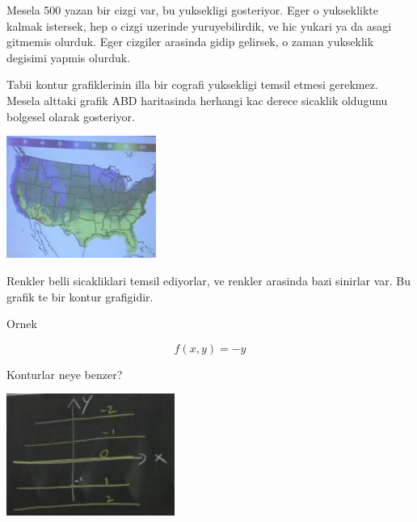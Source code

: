 \documentclass[12pt,fleqn]{article}
\begin{document}
Mesela 500 yazan bir cizgi var, bu yuksekligi gosteriyor. Eger o
yukseklikte kalmak istersek, hep o cizgi uzerinde yuruyebilirdik, ve hic
yukari ya da asagi gitmemis olurduk. Eger cizgiler arasinda gidip gelirsek,
o zaman yukseklik degisimi yapmis olurduk. 

Tabii kontur grafiklerinin illa bir cografi yuksekligi temsil etmesi
gerekmez. Mesela alttaki grafik ABD haritasinda herhangi kac derece
sicaklik oldugunu bolgesel olarak gosteriyor. 

\includegraphics[height=4cm]{8_10.png}

Renkler belli sicakliklari temsil ediyorlar, ve renkler arasinda bazi
sinirlar var. Bu grafik te bir kontur grafigidir. 

Ornek

\[ f(x,y) = -y \]

Konturlar neye benzer? 

\includegraphics[height=4cm]{8_11.png}
\end{document}
